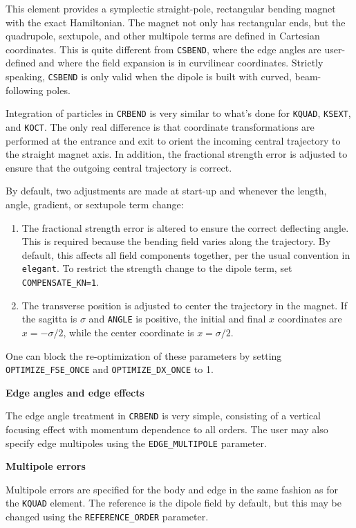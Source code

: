 This element provides a symplectic straight-pole, rectangular bending magnet with the exact
Hamiltonian.  The magnet not only has rectangular ends, but the
quadrupole, sextupole, and other multipole terms are defined in Cartesian coordinates.
This is quite different from \verb|CSBEND|, where the edge angles are user-defined and
where the field expansion is in curvilinear coordinates.
Strictly speaking, \verb|CSBEND| is only valid when the dipole is built with curved,
beam-following poles.

Integration of particles in \verb|CRBEND| is very similar to what's done for
\verb|KQUAD|, \verb|KSEXT|, and \verb|KOCT|. 
The only real difference is that coordinate transformations are performed at the
entrance and exit to orient the incoming central trajectory to the straight magnet axis.
In addition, the fractional strength error is adjusted to ensure that the 
outgoing central trajectory is correct.

By default, two adjustments are made at start-up and whenever the length, angle, 
gradient, or sextupole term change:
\begin{enumerate}
\item The fractional strength error is altered to ensure the correct deflecting angle. 
      This is required because the bending field varies along the trajectory.
      By default, this affects all field 
      components together, per the usual convention in {\tt elegant}. To restrict
      the strength change to the dipole term, set \verb|COMPENSATE_KN=1|.
\item The transverse position is adjusted to center the trajectory in the magnet.
      If the sagitta is $\sigma$ and \verb|ANGLE| is positive, the initial and final $x$ 
      coordinates are $x=-\sigma/2$, while the center coordinate is $x=\sigma/2$.
\end{enumerate}
One can block the re-optimization of these parameters by setting 
\verb|OPTIMIZE_FSE_ONCE| and \verb|OPTIMIZE_DX_ONCE| to 1.

{\bf Edge angles and edge effects} 

The edge angle treatment in \verb|CRBEND| is very simple, consisting of a 
vertical focusing effect with momentum dependence to all orders.
The user may also specify edge multipoles using the \verb|EDGE_MULTIPOLE| parameter.

{\bf Multipole errors}

Multipole errors are specified for the body and edge in the same fashion as for the
\verb|KQUAD| element.
The reference is the dipole field by default, but this may be changed using the
\verb|REFERENCE_ORDER| parameter.

